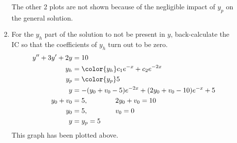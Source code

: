 \begin{enumerate}
\begin{enumerate}
                    \begin{figure}[H]
                        \centering
                    \end{figure}
                    The other 2 plots are not shown because of the negligible impact of
                    $ y_{p} $ on the general solution.

              \item For the $ y_{h} $ part of the solution to not be present in $ y $,
                    back-calculate the IC so that the coefficients of $ y_{h} $ turn out to
                    be zero.
                    \begin{align}
                        y'' + 3y' + 2y & = 10                                     \\
                        y_{h}          & = \color{y_h} c_{1}e^{-x} + c_{2}e^{-2x} \\
                        y_{p}          & = \color{y_p} 5                          \\
                        y              & = -(y_{0} + v_{0} - 5)e^{-2x} + (2y_{0}
                        + v_{0} - 10)e^{-x} + 5                                   \\
                        y_{0} + v_{0}  & = 5, \qquad\qquad 2y_{0}  + v_{0} = 10   \\
                        y_{0}          & = 5, \qquad \qquad v_{0} = 0             \\
                        y              & = y_{p} = 5
                    \end{align}
                    This graph has been plotted above.


\end{enumerate}
\end{enumerate}
